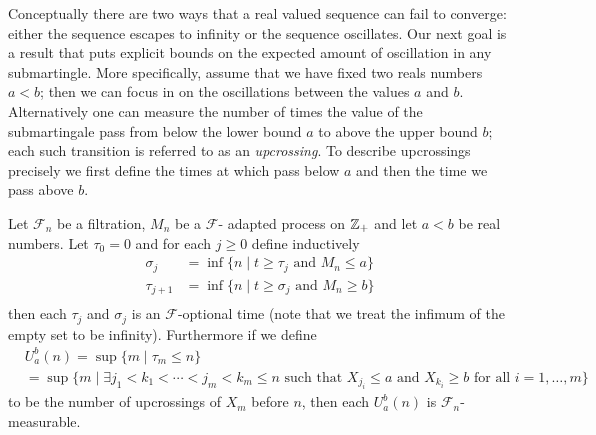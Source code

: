 Conceptually there are two ways that a real valued sequence can fail
to converge: either the sequence escapes to infinity or the sequence
oscillates.  Our next goal is a result that puts explicit bounds on
the expected amount of oscillation in any submartingle. More
specifically, 
assume that we have fixed two reals numbers $a < b$; then
we can focus in on the oscillations between the values $a$ and $b$.
Alternatively one can measure the number of times the value of the
submartingale pass from below the lower bound $a$ to above the upper
bound $b$; each such transition is referred to as an
\emph{upcrossing}.  To describe upcrossings precisely we first define
the times at which pass below $a$ and then the time we pass above $b$.
\begin{lem}\label{UpcrossingMeasurabilityDiscrete}Let $\mathcal{F}_n$ be a filtration, $M_n$ be a $\mathcal{F}$-
  adapted process on $\mathbb{Z}_+$ and let $a<b$ be real numbers.  Let $\tau_0 =0$ and for each $j \geq 0$ define
  inductively
\begin{align*}
\sigma_j &= \inf \lbrace n \mid t \geq \tau_j \text{ and } M_n \leq a \rbrace \\
\tau_{j+1} &= \inf \lbrace n \mid t \geq \sigma_j \text{ and } M_n \geq b \rbrace \\
\end{align*}
then each $\tau_j$ and $\sigma_j$ is an $\mathcal{F}$-optional time
(note that we treat the infimum of the empty set to be infinity).
Furthermore if we define 
\begin{align*}
&U_a^b(n) = \sup \lbrace m \mid \tau_m \leq n \rbrace \\
&= \sup \lbrace m \mid \exists  j_1 < k_1 < \dotsb < j_m <
k_m \leq n \text{ such that } X_{j_i} \leq a \text{ and } X_{k_i} \geq b
\text{ for all } i=1, \dotsc, m \rbrace
\end{align*}
to be the number of upcrossings of $X_m$ before $n$, then each $U_a^b(n)$
is $\mathcal{F}_n$-measurable.
\end{lem}
